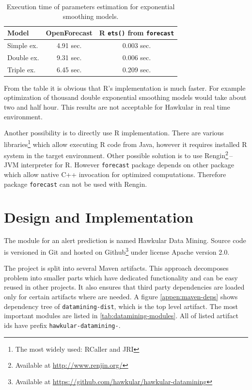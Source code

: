     \begin{table}[h]
        \begin{center}
            \begin{tabular}{l|c|c}
                \textbf{Model} & \textbf{OpenForecast} & \textbf{R \texttt{ets()} from \texttt{forecast}} \\ \hline \hline
                Simple ex. & 4.91 sec. & 0.003 sec.\\
                Double ex. & 9.31 sec. & 0.006 sec.\\
                Triple ex. & 6.45 sec. & 0.209 sec.\\
            \end{tabular}
            \caption{Execution time of parameters estimation for exponential smoothing models.}
            \label{tab:open-forecast-perf}
        \end{center}
    \end{table}

    From the table it is obvious that R's implementation is much faster. For example optimization of thousand double
    exponential smoothing models would take about two and half hour. This results are not acceptable for Hawkular in
    real time environment.

    Another possibility is to directly use R implementation. There are various libraries\footnote{The most widely used:
    RCaller and JRI}
    which allow executing R code from Java, however it requires installed R system in the target environment. Other
    possible solution is to use Rengin\footnote{Available at \url{http://www.renjin.org/}}\,--\,JVM interpreter for R.
    However \texttt{forecast} package depends on other package which allow native C++ invocation for optimized
    computations. Therefore package \texttt{forecast} can not be used with Rengin.

\chapter{Design and Implementation} \label{design-impl}
The module for an alert prediction is named Hawkular Data Mining. Source code is versioned in Git and
hosted on Github\footnote{Available at \url{https://github.com/hawkular/hawkular-datamining}} under
license Apache version 2.0.

The project is split into several Maven artifacts. This approach decomposes problem into smaller parts
which have dedicated functionality and can be easy reused in other projects. It also ensures that
third party dependencies are loaded only for certain artifacts where are needed. A figure \ref{appen:maven-deps}
shows dependency tree of \texttt{datamining-dist}, which is the top level artifact. The most important modules are
listed in \ref{tab:datamining-modules}. All of listed artifact ids have prefix \texttt{hawkular-datamining-}.

